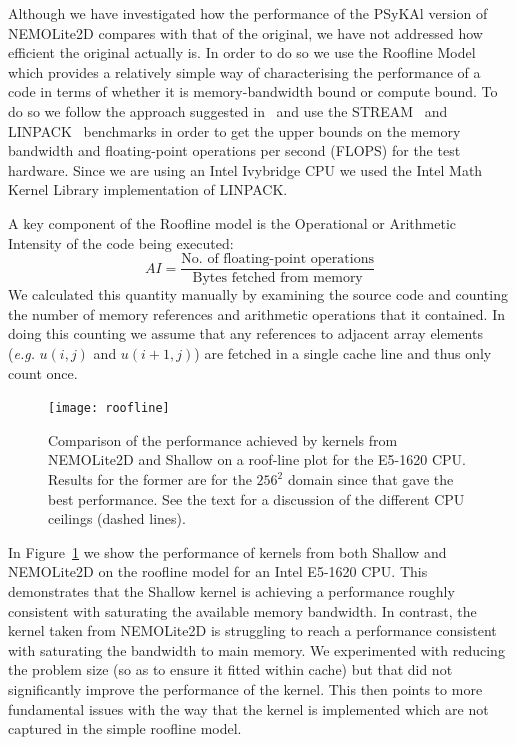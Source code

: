 \documentclass[gmd, manuscript]{copernicus}
\begin{document}
Although we have investigated how the performance of the {PS}y{KA}l
version of NEMOLite2D compares with that of the original, we have not
addressed how efficient the original actually is. In order to do so we
use the Roofline Model~\citep{roofline} which provides a relatively
simple way of characterising the performance of a code in terms of
whether it is memory-bandwidth bound or compute bound. To do so we
follow the approach suggested in~\cite{para_pearls} and use the
STREAM~\citep{stream} and LINPACK~\citep{linpack} benchmarks in order to
get the upper bounds on the memory bandwidth and floating-point
operations per second (FLOPS) for the test hardware. Since we are
using an Intel Ivybridge CPU we used the Intel Math Kernel Library
implementation of LINPACK.

A key component of the Roofline model is the Operational or Arithmetic
Intensity of the code being executed:
\[
AI = \frac{\textrm{No. of floating-point operations}}{\textrm{Bytes fetched from memory}}
\]
We calculated this quantity manually by examining the
source code and counting the number of memory references and
arithmetic operations that it contained. In doing this counting we
assume that any references to adjacent array elements (\textit{e.g.}
$u(i,j)$ and $u(i+1,j)$) are fetched in a single cache line and thus
only count once.

\begin{figure}
\centering
\texttt{[image: roofline]}
\caption{Comparison of the performance achieved by kernels from
  NEMOLite2D and Shallow on a roof-line plot for the E5-1620
  CPU. Results for the former are for the $256^2$ domain since that
  gave the best performance. See the text for a discussion of the
  different CPU ceilings (dashed lines).}
\label{FIG_roofline}
\end{figure}

In Figure~\ref{FIG_roofline} we show the performance of kernels from
both Shallow and NEMOLite2D on the roofline model for an Intel E5-1620 CPU.
This demonstrates that the Shallow kernel is achieving a performance
roughly consistent with saturating the available memory bandwidth. In
contrast, the kernel taken from NEMOLite2D is struggling to reach a
performance consistent with saturating the bandwidth to main
memory. We experimented with reducing the problem size (so as to
ensure it fitted within cache) but that did not significantly improve
the performance of the kernel. This then points to more fundamental issues
with the way that the kernel is implemented which are not captured in the
simple roofline model.
\end{document}
